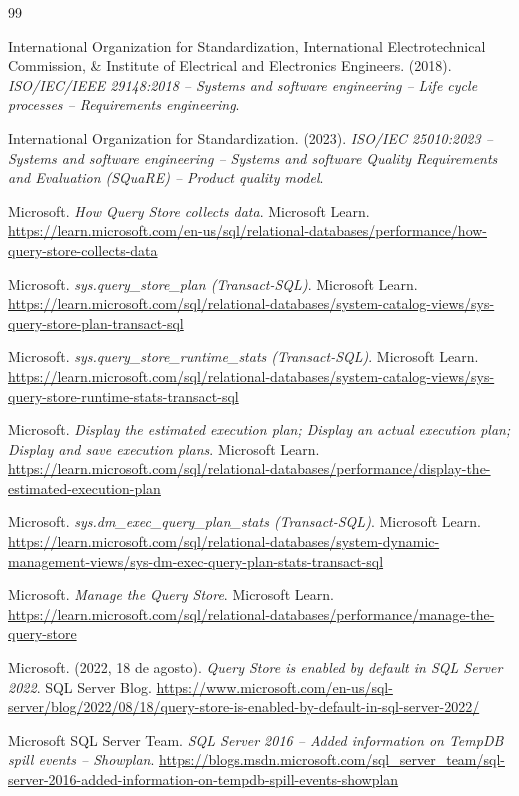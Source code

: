 \documentclass[11pt,a4paper]{report}
\begin{document}
\begin{thebibliography}{99}

 International Organization for Standardization, International Electrotechnical Commission, \& Institute of Electrical and Electronics Engineers. (2018). \textit{ISO/IEC/IEEE 29148:2018 -- Systems and software engineering -- Life cycle processes -- Requirements engineering}.

 International Organization for Standardization. (2023). \textit{ISO/IEC 25010:2023 -- Systems and software engineering -- Systems and software Quality Requirements and Evaluation (SQuaRE) -- Product quality model}.

 Microsoft. \textit{How Query Store collects data}. Microsoft Learn. \url{https://learn.microsoft.com/en-us/sql/relational-databases/performance/how-query-store-collects-data}

 Microsoft. \textit{sys.query\_store\_plan (Transact-SQL)}. Microsoft Learn. \url{https://learn.microsoft.com/sql/relational-databases/system-catalog-views/sys-query-store-plan-transact-sql}

 Microsoft. \textit{sys.query\_store\_runtime\_stats (Transact-SQL)}. Microsoft Learn. \url{https://learn.microsoft.com/sql/relational-databases/system-catalog-views/sys-query-store-runtime-stats-transact-sql}

 Microsoft. \textit{Display the estimated execution plan; Display an actual execution plan; Display and save execution plans}. Microsoft Learn. \url{https://learn.microsoft.com/sql/relational-databases/performance/display-the-estimated-execution-plan}

 Microsoft. \textit{sys.dm\_exec\_query\_plan\_stats (Transact-SQL)}. Microsoft Learn. \url{https://learn.microsoft.com/sql/relational-databases/system-dynamic-management-views/sys-dm-exec-query-plan-stats-transact-sql}

 Microsoft. \textit{Manage the Query Store}. Microsoft Learn. \url{https://learn.microsoft.com/sql/relational-databases/performance/manage-the-query-store}

 Microsoft. (2022, 18 de agosto). \textit{Query Store is enabled by default in SQL Server 2022}. SQL Server Blog. \url{https://www.microsoft.com/en-us/sql-server/blog/2022/08/18/query-store-is-enabled-by-default-in-sql-server-2022/}

 Microsoft SQL Server Team. \textit{SQL Server 2016 -- Added information on TempDB spill events -- Showplan}. \url{https://blogs.msdn.microsoft.com/sql_server_team/sql-server-2016-added-information-on-tempdb-spill-events-showplan}


\end{thebibliography}
\end{document}
